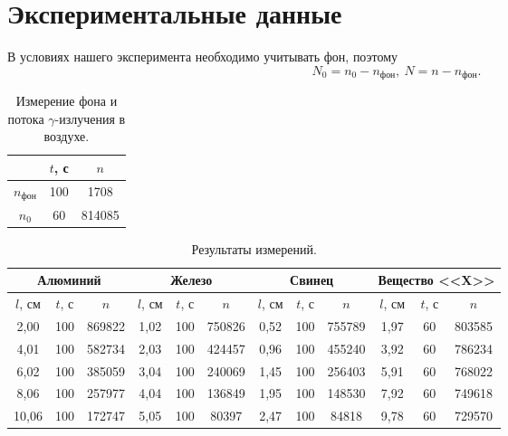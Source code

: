 \documentclass[a4paper,12pt]{article} %
\begin{document}
	\newpage
	\section{Экспериментальные данные}
		В условиях нашего эксперимента необходимо учитывать фон, поэтому
		\begin{equation*}
			N_0 = n_0 - n_\text{фон}, \ N = n - n_\text{фон}.
		\end{equation*}
		
		
		\begin{table}[H]
			\caption{Измерение фона и потока $\gamma$-излучения в воздухе.}
			\label{table:exp1}
			\begin{tabular}{|c|c|c|}
				\hline
				& $t$, с & $n$    \\ \hline
				$n_{\text{фон}}$ & 100    & 1708   \\ \hline
				$n_0$            & 60     & 814085 \\ \hline
			\end{tabular}
		\end{table}
		
		
	
		\begin{table}[H]
			\caption{Результаты измерений.}
			\label{table:exp2}
			\begin{tabular}{|c|c|c|c|c|c|c|c|c|c|c|c|}
				\hline
				\multicolumn{3}{|c|}{Алюминий} & \multicolumn{3}{c|}{Железо} & \multicolumn{3}{c|}{Свинец} & \multicolumn{3}{c|}{Вещество <<X>>} \\ \hline
				$l$, см   & $t$, с   & $n$     & $l$, см  & $t$, с  & $n$    & $l$, см  & $t$, с  & $n$    & $l$, см     & $t$, с    & $n$       \\ \hline
				2,00      & 100      & 869822  & 1,02     & 100     & 750826 & 0,52     & 100     & 755789 & 1,97        & 60        & 803585    \\ \hline
				4,01      & 100      & 582734  & 2,03     & 100     & 424457 & 0,96     & 100     & 455240 & 3,92        & 60        & 786234    \\ \hline
				6,02      & 100      & 385059  & 3,04     & 100     & 240069 & 1,45     & 100     & 256403 & 5,91        & 60        & 768022    \\ \hline
				8,06      & 100      & 257977  & 4,04     & 100     & 136849 & 1,95     & 100     & 148530 & 7,92        & 60        & 749618    \\ \hline
				10,06     & 100      & 172747  & 5,05     & 100     & 80397  & 2,47     & 100     & 84818  & 9,78        & 60        & 729570    \\ \hline
			\end{tabular}
		\end{table}
	
\end{document}
